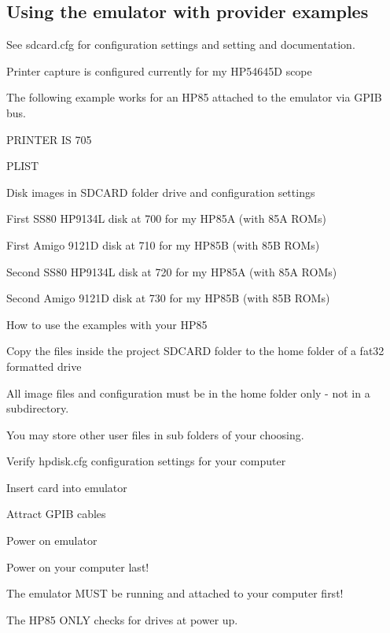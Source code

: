 \begin{DoxyItemize}
\begin{DoxyItemize}
\begin{DoxyItemize}
\begin{DoxyItemize}
 \subsection*{Using the emulator with provider examples}
\end{DoxyItemize}
\end{DoxyItemize}
\item See sdcard.\+cfg for configuration settings and setting and documentation.
\begin{DoxyItemize}
\item Printer capture is configured currently for my H\+P54645D scope
\begin{DoxyItemize}
\item The following example works for an H\+P85 attached to the emulator via G\+P\+IB bus.
\begin{DoxyItemize}
\item P\+R\+I\+N\+T\+ER IS 705
\item P\+L\+I\+ST
\end{DoxyItemize}
\end{DoxyItemize}
\item Disk images in S\+D\+C\+A\+RD folder drive and configuration settings
\begin{DoxyItemize}
\item First S\+S80 H\+P9134L disk at 700 for my H\+P85A (with 85A R\+O\+Ms)
\item First Amigo 9121D disk at 710 for my H\+P85B (with 85B R\+O\+Ms)
\item Second S\+S80 H\+P9134L disk at 720 for my H\+P85A (with 85A R\+O\+Ms)
\item Second Amigo 9121D disk at 730 for my H\+P85B (with 85B R\+O\+Ms)
\end{DoxyItemize}
\item How to use the examples with your H\+P85
\begin{DoxyItemize}
\item Copy the files inside the project S\+D\+C\+A\+RD folder to the home folder of a fat32 formatted drive
\begin{DoxyItemize}
\item All image files and configuration must be in the home folder only -\/ not in a subdirectory.
\item You may store other user files in sub folders of your choosing.
\end{DoxyItemize}
\item Verify hpdisk.\+cfg configuration settings for your computer
\item Insert card into emulator
\item Attract G\+P\+IB cables
\item Power on emulator
\item Power on your computer last!
\begin{DoxyItemize}
\item The emulator M\+U\+ST be running and attached to your computer first!
\item The H\+P85 O\+N\+LY checks for drives at power up. 


\end{DoxyItemize}
\end{DoxyItemize}
\end{DoxyItemize}
\end{DoxyItemize}
\end{DoxyItemize}
